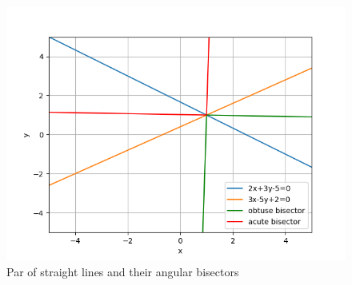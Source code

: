 \documentclass[journal,12pt,twocolumn]{IEEEtran}
\numberwithin{equation}{subsection}
\begin{document}
\begin{figure}[t]
    \centering
    \includegraphics[width=\columnwidth]{Fig2_a5.png}
    \caption{Par of straight lines and their angular bisectors}
    \label{fig:my_label}
\end{figure}
\end{document}
